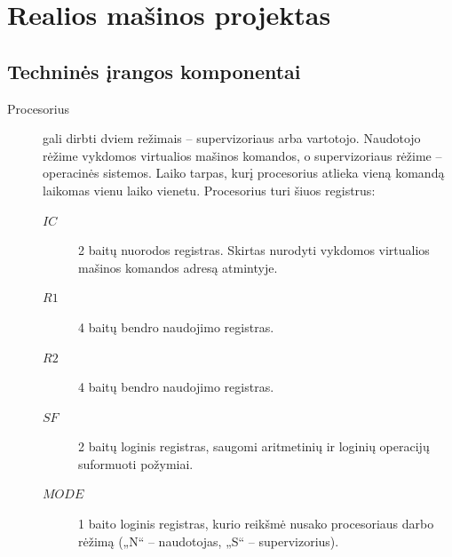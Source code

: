 \section{Realios mašinos projektas}

\subsection{Techninės įrangos komponentai}

\begin{description}
\item[Procesorius] gali dirbti dviem režimais – supervizoriaus arba vartotojo. Naudotojo rėžime vykdomos virtualios mašinos komandos, o supervizoriaus rėžime – operacinės sistemos. Laiko tarpas, kurį procesorius atlieka vieną komandą laikomas vienu laiko vienetu. Procesorius turi šiuos registrus:
    \begin{description}
        \item[$IC$] 2 baitų nuorodos registras. Skirtas nurodyti vykdomos 
        virtualios mašinos komandos adresą atmintyje.
        \item[$R1$] 4 baitų bendro naudojimo registras.
        \item[$R2$] 4 baitų bendro naudojimo registras.
        \item[$SF$] 2 baitų loginis registras, saugomi aritmetinių ir loginių operacijų suformuoti požymiai.
        \item[$MODE$] 1 baito loginis registras, kurio reikšmė nusako 
        procesoriaus darbo rėžimą („N“ – naudotojas, „S“ – supervizorius).
    \end{description}
\end{description}

        